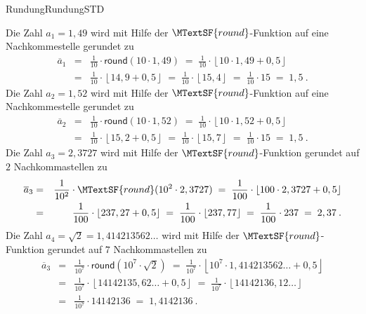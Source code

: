 \begin{MXContent}{Rundung}{Rundung}{STD}
\begin{MExample}
Die Zahl $a_{1}=1,49$ wird mit Hilfe der $\MTextSF{round}$-Funktion auf eine Nachkommestelle gerundet zu
\begin{eqnarray*}
\overline{a}_1 & = & \frac{1}{10}\cdot \mathsf{round}(10 \cdot 1,49) \; =\; \frac{1}{10}\cdot \left\lfloor{10\cdot 1,49 + 0,5}\right\rfloor\\
&=& \frac{1}{10}\cdot \left\lfloor{14,9+0,5}\right\rfloor \;=\; \frac{1}{10}\cdot \left\lfloor{ 15,4 }\right\rfloor \;=\; \frac{1}{10}\cdot 15 \;=\; 1,5\: .
\end{eqnarray*}
Die Zahl $a_{2}=1,52$ wird mit Hilfe der $\MTextSF{round}$-Funktion auf eine Nachkommestelle gerundet zu
\begin{eqnarray*}
\overline{a}_{2}& = & \frac{1}{10}\cdot \mathsf{round}(10 \cdot 1,52)\; =\; \frac{1}{10}\cdot \left\lfloor{ 10\cdot 1,52 + 0,5 }\right\rfloor \\
& = & \frac{1}{10}\cdot \left\lfloor{ 15,2+0,5}\right\rfloor \;=\; \frac{1}{10}\cdot \left\lfloor{ 15,7 }\right\rfloor\; =\; \frac{1}{10}\cdot 15 \;=\; 1,5\: .
\end{eqnarray*}
Die Zahl $a_{3}=2,3727$ wird mit Hilfe der $\MTextSF{round}$-Funktion gerundet auf $2$ Nachkommastellen zu
\begin{eqnarray*}
\overline{a}_{3} & = & \frac{1}{10^{2}}\cdot \MTextSF{round}(10^{2}\cdot 2,3727)\; =\; \frac{1}{100}\cdot \left\lfloor{ 100\cdot 2,3727 + 0,5 }\right\rfloor \\
& = & \frac{1}{100}\cdot \left\lfloor{ 237,27+0,5}\right\rfloor\; =\; \frac{1}{100}\cdot \left\lfloor{ 237,77 }\right\rfloor \; =\;  \frac{1}{100}\cdot 237\; =\; 2,37\: .
\end{eqnarray*}
Die Zahl  $a_{4}=\sqrt{2}=1,414213562\ldots$ wird mit Hilfe der $\MTextSF{round}$-Funktion gerundet auf $7$ Nachkommastellen zu
\begin{eqnarray*}
\overline{a}_{3} & = & \frac{1}{10^{7}}\cdot \mathsf{round}(10^{7}\cdot \sqrt{2})\; =\; \frac{1}{10^{7}}\cdot \left\lfloor{ 10^{7}\cdot 1,414213562\ldots + 0,5 }\right\rfloor \\
& = & \frac{1}{10^{7}}\cdot \left\lfloor{ 14142135,62\ldots+0,5}\right\rfloor \;=\; \frac{1}{10^{7}}\cdot \left\lfloor{ 14142136,12\ldots }\right\rfloor \\
& = & \frac{1}{10^{7}}\cdot 14142136\; =\;  1,4142136\: .
\end{eqnarray*}
\end{MExample}


\end{MXContent}
